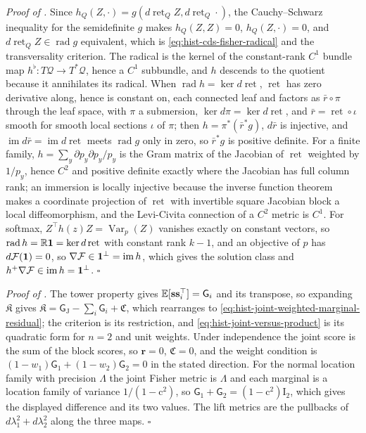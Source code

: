 \noindent\emph{Proof of .}
Since $h_Q(Z,\cdot)=g(d\operatorname{ret}_QZ,d\operatorname{ret}_Q\cdot)$, the
Cauchy--Schwarz inequality for the semidefinite $g$ makes $h_Q(Z,Z)=0$,
$h_Q(Z,\cdot)=0$, and $d\operatorname{ret}_QZ\in\operatorname{rad}g$ equivalent, which is
\eqref{eq:hist-cds-fisher-radical} and the transversality criterion.  The radical is the
kernel of the constant-rank $C^1$ bundle map $h^\flat:T\mathcal Q\to T^*\mathcal Q$,
hence a $C^1$ subbundle, and $h$ descends to the quotient because it annihilates its
radical.  When $\operatorname{rad}h=\ker d\operatorname{ret}$, $\operatorname{ret}$ has
zero derivative along, hence is constant on, each connected leaf and factors as $\bar r\circ\pi$ through the leaf space,
with $\pi$ a submersion, $\ker d\pi=\ker d\operatorname{ret}$, and
$\bar r=\operatorname{ret}\circ\iota$ smooth for smooth local sections $\iota$ of $\pi$;
then $h=\pi^*(\bar r^*g)$, $d\bar r$ is injective, and
$\operatorname{im}d\bar r=\operatorname{im}d\operatorname{ret}$ meets
$\operatorname{rad}g$ only in zero, so $\bar r^*g$ is positive definite.  For a finite
family, $h=\sum_y\partial p_y\partial p_y/p_y$ is the Gram matrix of the Jacobian of
$\operatorname{ret}$ weighted by $1/p_y$, hence $C^2$ and positive definite exactly
where the Jacobian has full column rank; an immersion is locally injective because the
inverse function theorem \citep[Ch.~4]{Lee2012} makes a coordinate projection of
$\operatorname{ret}$ with invertible square Jacobian block a local diffeomorphism, and
the Levi-Civita connection of a $C^2$ metric is $C^1$.  For softmax,
$Z^\top h(z)Z=\operatorname{Var}_p(Z)$ vanishes exactly on constant vectors, so
$\operatorname{rad}h=\mathbb R\mathbf 1=\ker d\operatorname{ret}$ with constant rank $k-1$, and
an objective of $p$ has $d\mathcal F(\mathbf 1)=0$, so
$\nabla\mathcal F\in\mathbf 1^\perp=\operatorname{im}h$, which gives the solution class and
$h^+\nabla\mathcal F\in\operatorname{im}h=\mathbf 1^\perp$.  $\square$

\noindent\emph{Proof of .}
The tower property gives $\mathbb E[\mathbf s\mathbf s_i^\top]=\mathsf G_i$ and its transpose,
so expanding $\mathfrak K$ gives $\mathfrak K=\mathsf G_{\mathrm J}-\sum_i\mathsf
G_i+\mathfrak C$, which rearranges to \eqref{eq:hist-joint-weighted-marginal-residual};
the criterion is its restriction, and \eqref{eq:hist-joint-versus-product} is its
quadratic form for $n=2$ and unit weights.  Under independence the joint score is the
sum of the block scores, so $\mathbf r=0$, $\mathfrak C=0$, and the weight condition is
$(1-w_1)\mathsf G_1+(1-w_2)\mathsf G_2=0$ in the stated direction.  For the normal
location family with precision $\Lambda$ the joint Fisher metric is $\Lambda$ and each
marginal is a location family of variance $1/(1-\mathrm c^2)$, so
$\mathsf G_1+\mathsf G_2=(1-\mathrm c^2)\mathrm I_2$, which gives the displayed difference
and its two values.  The lift metrics are the pullbacks of $d\lambda_1^2+d\lambda_2^2$
along the three maps.  $\square$

